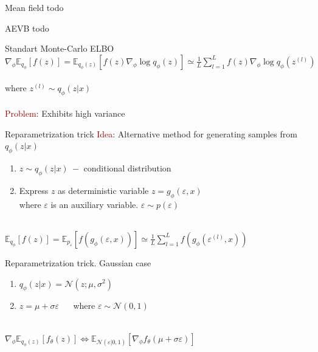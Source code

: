 \documentclass[unicode,11pt]{beamer}
\begin{document}
\begin{frame}[fragile]{Mean field}
  todo 
\end{frame}

\begin{frame}[fragile]{AEVB}
todo
\end{frame}

\begin{frame}[fragile]{Standart Monte-Carlo ELBO}
  $\nabla_{\phi} \mathbb{E}_{q_{\phi}} [f(z)] = \mathbb{E}_{q_{\phi}(z)} \left[ f(z) \nabla_{\phi} 
  \log q_{\phi}(z) \right] \simeq \frac{1}{L} \sum\limits_{l=1}^L f(z) \nabla_{\phi} \log q_{\phi}(z^{(l)})$\\
  ~\\
  where $z^{(l)} \sim q_{\phi}(z|x)$\\
  ~\\
  \textcolor{darkred}{Problem}: Exhibits high variance
\end{frame}

\begin{frame}[fragile]{Reparametrization trick}
  \textcolor{darkred}{Idea}: Alternative method for generating samples from $q_{\phi}(z|x)$
  ~\\
  \begin{enumerate}
    \item $z \sim q_{\phi}(z|x)~-$ conditional distribution    
    \item Express $z$ as deterministic variable $z = g_{\phi}(\varepsilon, x)$\\
      where $\varepsilon$ is an auxiliary variable. $\varepsilon \sim p(\varepsilon)$
  \end{enumerate}
~\\
  $\mathbb{E}_{q_{\phi}}[f(z)] = \mathbb{E}_{p_{\varepsilon}} \left[ f(g_{\phi}(\varepsilon, x)) \right] \simeq 
  \frac{1}{L} \sum\limits_{l=1}^L f(g_{\phi}(\varepsilon^{(l)}, x))$
\end{frame}

\begin{frame}[fragile]{Reparametrization trick. Gaussian case}
  \begin{enumerate}    
    \item $q_\phi(z|x) = \mathcal{N}(z; \mu, \sigma^2)$
    \item $z = \mu + \sigma\varepsilon$ ~~ where $\varepsilon \sim \mathcal{N}(0, 1)$ 
  \end{enumerate}
  ~\\
  $\nabla_{\phi} \mathbb{E}_{q_{\phi}(z)} [f_{\theta}(z)] \Leftrightarrow 
  \mathbb{E}_{\mathcal{N}(\varepsilon| 0, 1)} [\nabla_{\phi} f_{\theta} (\mu + \sigma \varepsilon)]$
\end{frame}
\end{document}
